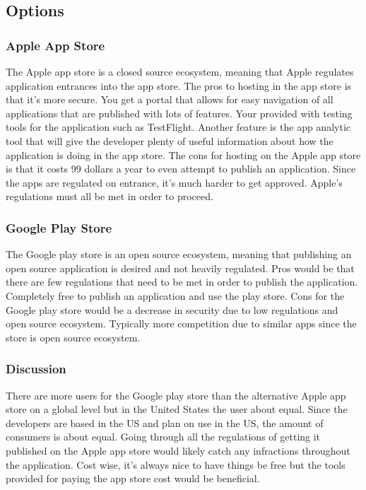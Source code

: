 \documentclass[letterpaper,10pt,draftclsnofoot,onecolumn,compsoc]{IEEEtran}
\begin{document}
\subsection{Options}


\subsubsection{Apple App Store}
\begin{singlespace}
\noindent
The Apple app store is a closed source ecosystem, meaning that Apple regulates application entrances into the app store. The pros to hosting in the app store is that it's more secure. You get a portal that allows for easy navigation of all applications that are published with lots of features. Your provided with testing tools for the application such as TestFlight. Another feature is the app analytic tool that will give the developer plenty of useful information about how the application is doing in the app store. The cons for hosting on the Apple app store is that it costs 99 dollars a year to even attempt to publish an application. Since the apps are regulated on entrance, it's much harder to get approved. Apple's regulations must all be met in order to proceed.
\end{singlespace}

\subsubsection{Google Play Store}
\begin{singlespace}
\noindent
The Google play store is an open source ecosystem, meaning that publishing an open source application is desired and not heavily regulated. Pros would be that there are few regulations that need to be met in order to publish the application. Completely free to publish an application and use the play store. Cons for the Google play store would be a decrease in security due to low regulations and open source ecosystem. Typically more competition due to similar apps since the store is open source ecosystem. 
\end{singlespace}

\subsubsection{Discussion}
\begin{singlespace}
\noindent
There are more users for the Google play store than the alternative Apple app store on a global level but in the United States the user about equal. Since the developers are based in the US and plan on use in the US, the amount of consumers is about equal. Going through all the regulations of getting it published on the Apple app store would likely catch any infractions throughout the application. Cost wise, it's always nice to have things be free but the tools provided for paying the app store cost would be beneficial.
\end{singlespace}
\end{document}

